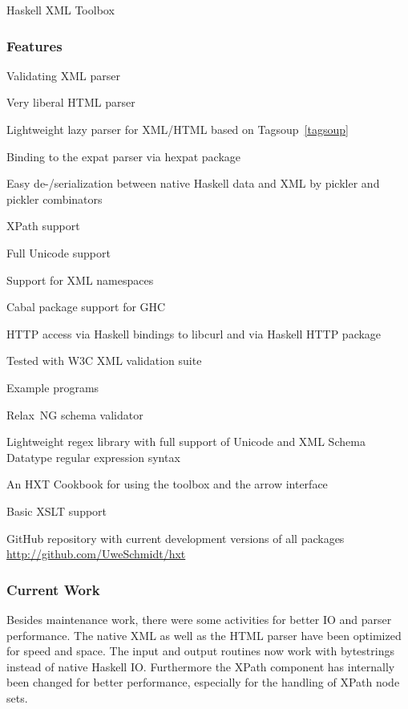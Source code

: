 \begin{hcarentry}[updated]{Haskell XML Toolbox}
\subsubsection*{Features}

\begin{compactitem}
\item Validating XML parser
\item Very liberal HTML parser
\item Lightweight lazy parser for XML/HTML based on Tagsoup~\cref{tagsoup}
\item Binding to the expat parser via hexpat package
\item Easy de-/serialization between native Haskell data and XML by pickler and pickler combinators
\item XPath support
\item Full Unicode support
\item Support for XML namespaces
\item Cabal package support for GHC
\item HTTP access via Haskell bindings to libcurl and via Haskell HTTP
  package
\item Tested with W3C XML validation suite
\item Example programs
\item Relax~NG schema validator
\item Lightweight regex library with full support of Unicode and XML Schema
  Datatype regular expression syntax
\item An HXT Cookbook for using the toolbox and the arrow interface
\item Basic XSLT support
\item GitHub repository with current development versions of all packages
  \url{http://github.com/UweSchmidt/hxt}
\end{compactitem}

\subsubsection*{Current Work}

Besides maintenance work, there were some activities for
better IO and parser performance. The native XML as well as the HTML parser have
been optimized for speed and space. The input and output routines now work
with bytestrings instead of native Haskell IO. Furthermore the XPath component
has internally been changed for better performance, especially for the
handling of XPath node sets.


\end{hcarentry}
